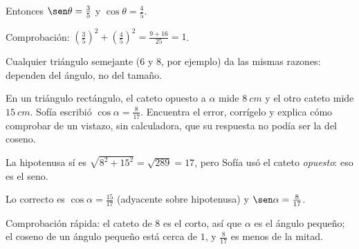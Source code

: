 \documentclass[11pt]{article}
\begin{document}
\begin{preguntas}
\begin{solucion}[5.5cm]
Entonces $\sen \theta = \frac{3}{5}$ y $\cos \theta = \frac{4}{5}$.

Comprobación: $\left(\frac{3}{5}\right)^2 + \left(\frac{4}{5}\right)^2 = \frac{9 + 16}{25} = 1$.

Cualquier triángulo semejante ($6$ y $8$, por ejemplo) da las mismas razones: dependen del
ángulo, no del tamaño.
\end{solucion}

\pregunta[1] En un triángulo rectángulo, el cateto opuesto a $\alpha$ mide $\qty{8}{cm}$ y el
otro cateto mide $\qty{15}{cm}$. Sofía escribió $\cos \alpha = \frac{8}{17}$. Encuentra el
error, corrígelo y explica cómo comprobar de un vistazo, sin calculadora, que su respuesta no
podía ser la del coseno.
\begin{solucion}[5cm]
La hipotenusa sí es $\sqrt{8^2 + 15^2} = \sqrt{289} = 17$, pero Sofía usó el cateto
\emph{opuesto}: eso es el seno.

Lo correcto es $\cos \alpha = \frac{15}{17}$ (adyacente sobre hipotenusa) y
$\sen \alpha = \frac{8}{17}$.

Comprobación rápida: el cateto de $8$ es el corto, así que $\alpha$ es el ángulo pequeño; el
coseno de un ángulo pequeño está cerca de $1$, y $\frac{8}{17}$ es menos de la mitad.
\end{solucion}

\end{preguntas}
\end{document}
